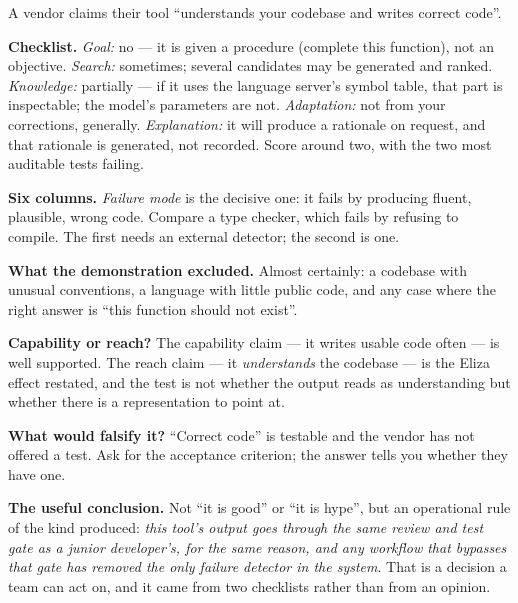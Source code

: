 \begin{worked}
A vendor claims their tool ``understands your codebase and writes correct code''.

\smallskip
\textbf{Checklist.} \emph{Goal:} no --- it is given a procedure (complete this
function), not an objective. \emph{Search:} sometimes; several candidates may be
generated and ranked. \emph{Knowledge:} partially --- if it uses the language
server's symbol table, that part is inspectable; the model's parameters are not.
\emph{Adaptation:} not from your corrections, generally. \emph{Explanation:} it will
produce a rationale on request, and that rationale is generated, not recorded. Score
around two, with the two most auditable tests failing.

\smallskip
\textbf{Six columns.} \emph{Failure mode} is the decisive one: it fails by producing
fluent, plausible, wrong code. Compare a type checker, which fails by refusing to
compile. The first needs an external detector; the second is one.

\smallskip
\textbf{What the demonstration excluded.} Almost certainly: a codebase with
unusual conventions, a language with little public code, and any case where the
right answer is ``this function should not exist''.

\smallskip
\textbf{Capability or reach?} The capability claim --- it writes usable code often
--- is well supported. The reach claim --- it \emph{understands} the codebase ---
is the  Eliza effect restated, and the test is not whether the output
reads as understanding but whether there is a representation to point at.

\smallskip
\textbf{What would falsify it?} ``Correct code'' is testable and the vendor has not
offered a test. Ask for the acceptance criterion; the answer tells you whether they
have one.

\smallskip
\textbf{The useful conclusion.} Not ``it is good'' or ``it is hype'', but an
operational rule of the kind  produced: \emph{this tool's output goes
through the same review and test gate as a junior developer's, for the same reason,
and any workflow that bypasses that gate has removed the only failure detector in
the system}. That is a decision a team can act on, and it came from two checklists
rather than from an opinion.
\end{worked}

